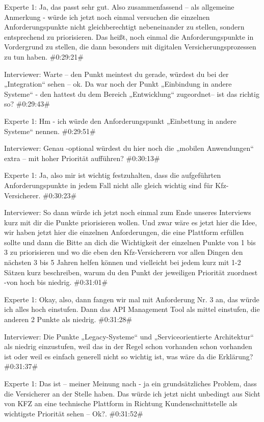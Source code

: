 Experte 1:
Ja, das passt sehr gut. Also zusammenfassend – als allgemeine Anmerkung - würde ich jetzt noch einmal versuchen die einzelnen Anforderungspunkte nicht gleichberechtigt nebeneinander zu stellen, sondern entsprechend zu priorisieren. Das heißt, noch einmal die Anforderungspunkte in Vordergrund zu stellen, die dann besonders mit digitalen Versicherungsprozessen zu tun haben. 
\#0:29:21\#

Interviewer:
Warte – den Punkt meintest du gerade, würdest du bei der „Integration“ sehen – ok. Da war noch der Punkt „Einbindung in andere Systeme“ - den hattest du dem Bereich „Entwicklung“ zugeordnet– ist das richtig so?
\#0:29:43\#

Experte 1:
Hm - ich würde den Anforderungspunkt „Einbettung in andere Systeme“ nennen.
\#0:29:51\#

Interviewer:
Genau -optional würdest du hier noch die „mobilen Anwendungen“ extra – mit hoher Priorität aufführen?
\#0:30:13\#

Experte 1:
Ja, also mir ist wichtig festzuhalten, dass die aufgeführten Anforderungspunkte in jedem Fall nicht alle gleich wichtig sind für Kfz-Versicherer. 
\#0:30:23\#

Interviewer:
So dann würde ich jetzt noch einmal zum Ende unseres Interviews kurz mit dir die Punkte priorisieren wollen. Und zwar wäre es jetzt hier die Idee, wir haben jetzt hier die einzelnen Anforderungen, die eine Plattform erfüllen sollte und dann die Bitte an dich die Wichtigkeit der einzelnen Punkte von 1 bis 3 zu priorisieren und wo die eben den Kfz-Versicherern vor allen Dingen den nächsten 3 bis 5 Jahren helfen können und vielleicht bei jedem kurz mit 1-2 Sätzen kurz beschreiben, warum du den Punkt der jeweiligen Priorität zuordnest -von hoch bis niedrig.
\#0:31:01\#

Experte 1:
Okay, also, dann fangen wir mal mit Anforderung Nr. 3 an, das würde ich alles hoch einstufen. Dann das API Management Tool als mittel einstufen, die anderen 2 Punkte als niedrig.
\#0:31:28\#

Interviewer:
Die Punkte „Legacy-Systeme“ und „Serviceorientierte Architektur“ als niedrig einzustufen, weil das in der Regel schon vorhanden schon vorhanden ist oder weil es einfach generell nicht so wichtig ist, was wäre da die Erklärung?
\#0:31:37\#

Experte 1:
Das ist – meiner Meinung nach - ja ein grundsätzliches Problem, dass die Versicherer an der Stelle haben. Das würde ich jetzt nicht unbedingt aus Sicht von KFZ an eine technische Plattform in Richtung Kundenschnittstelle als wichtigste Priorität sehen – Ok?.
\#0:31:52\#

